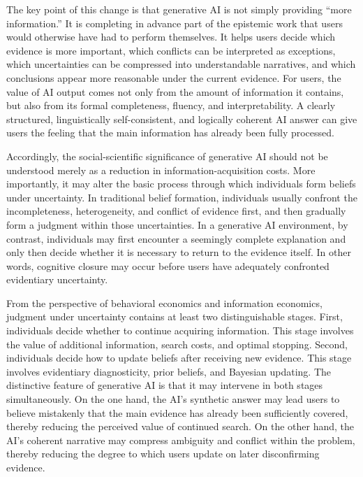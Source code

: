 The key point of this change is that generative AI is not simply providing ``more information.'' It is completing in advance part of the epistemic work that users would otherwise have had to perform themselves. It helps users decide which evidence is more important, which conflicts can be interpreted as exceptions, which uncertainties can be compressed into understandable narratives, and which conclusions appear more reasonable under the current evidence. For users, the value of AI output comes not only from the amount of information it contains, but also from its formal completeness, fluency, and interpretability. A clearly structured, linguistically self-consistent, and logically coherent AI answer can give users the feeling that the main information has already been fully processed.

Accordingly, the social-scientific significance of generative AI should not be understood merely as a reduction in information-acquisition costs. More importantly, it may alter the basic process through which individuals form beliefs under uncertainty. In traditional belief formation, individuals usually confront the incompleteness, heterogeneity, and conflict of evidence first, and then gradually form a judgment within those uncertainties. In a generative AI environment, by contrast, individuals may first encounter a seemingly complete explanation and only then decide whether it is necessary to return to the evidence itself. In other words, cognitive closure may occur before users have adequately confronted evidentiary uncertainty.

From the perspective of behavioral economics and information economics, judgment under uncertainty contains at least two distinguishable stages. First, individuals decide whether to continue acquiring information. This stage involves the value of additional information, search costs, and optimal stopping. Second, individuals decide how to update beliefs after receiving new evidence. This stage involves evidentiary diagnosticity, prior beliefs, and Bayesian updating. The distinctive feature of generative AI is that it may intervene in both stages simultaneously. On the one hand, the AI's synthetic answer may lead users to believe mistakenly that the main evidence has already been sufficiently covered, thereby reducing the perceived value of continued search. On the other hand, the AI's coherent narrative may compress ambiguity and conflict within the problem, thereby reducing the degree to which users update on later disconfirming evidence.

